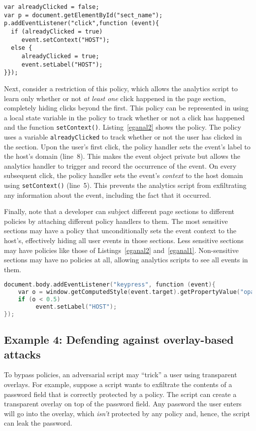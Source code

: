 \begin{lstlisting}[float,caption=Policy that only tracks whether a click
  happened or not,label=eganal2]
var alreadyClicked = false;
var p = document.getElementById("sect_name");
p.addEventListener("click",function (event){
  if (alreadyClicked = true) 
     event.setContext("HOST");
  else {
     alreadyClicked = true; 
     event.setLabel("HOST");
}});
\end{lstlisting}

Next, consider a restriction of this policy, which allows the
analytics script to learn only whether or not \emph{at least one}
click happened in the page section, completely hiding clicks beyond
the first. This policy can be represented in {\sys} using a local
state variable in the policy to track whether or not a click has
happened and the function \texttt{setContext()}. Listing~\ref{eganal2}
shows the policy. The policy uses a variable \texttt{alreadyClicked}
to track whether or not the user has clicked in the section. Upon the
user's first click, the policy handler sets the event's label to the
host's domain (line~8). This makes the event object private but allows
the analytics handler to trigger and record the occurrence of the
event. On every subsequent click, the policy handler sets the event's
\emph{context} to the host domain using \texttt{setContext()}
(line~5). This prevents the analytics script from exfiltrating any
information about the event, including the fact that it occurred.

Finally, note that a developer can subject different page sections to
different policies by attaching different policy handlers to them. The
most sensitive sections may have a policy that unconditionally sets
the event context to the host's, effectively hiding all user events in
those sections. Less sensitive sections may have policies like those
of Listings~\ref{eganal2} and~\ref{eganal1}. Non-sensitive sections
may have no policies at all, allowing analytics scripts to see all
events in them.

\begin{lstlisting}[float, caption=Example policy to prevent overlay-based
  stealing of keystrokes,label=overlay,language=C]
document.body.addEventListener("keypress", function (event){
    var o = window.getComputedStyle(event.target).getPropertyValue("opacity");
    if (o < 0.5) 
         event.setLabel("HOST");
});
\end{lstlisting}

\subsection{Example 4: Defending against overlay-based attacks}
To bypass {\sys} policies, an adversarial script may ``trick'' a user
using transparent overlays. For example, suppose a script wants to
exfiltrate the contents of a password field that is correctly
protected by a {\sys} policy. The script can create a transparent
overlay on top of the password field. Any password the user enters
will go into the overlay, which \emph{isn't} protected by any policy
and, hence, the script can leak the password.

